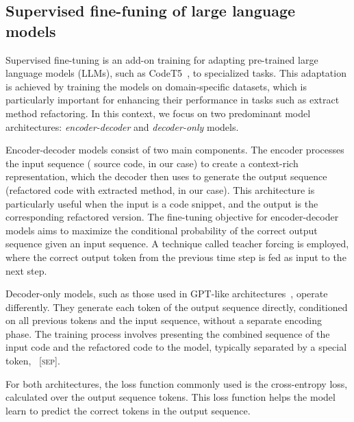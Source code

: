 
\subsection{Supervised fine-funing of large language models}


Supervised fine-tuning is an add-on training for adapting pre-trained large language models (LLMs), such as CodeT5~\cite{wang2021codet5identifierawareunifiedpretrained}, to specialized tasks. 
This adaptation is achieved by training the models on domain-specific datasets, which is particularly important for enhancing their performance in tasks such as extract method refactoring. In this context, we focus on two predominant model architectures: \textit{encoder-decoder} and \textit{decoder-only} models.

Encoder-decoder models consist of two main components. 
The encoder processes the input sequence (\ie{} source code, in our case) to create a context-rich representation, which the decoder then uses to generate the output sequence (refactored code with extracted method, in our case).
This architecture is particularly useful when the input is a code snippet, and the output is the corresponding refactored version. 
The fine-tuning objective for encoder-decoder models aims to maximize the conditional probability of the correct output sequence given an input sequence. 
A technique called teacher forcing is employed, where the correct output token from the previous time step is fed as input to the next step. 

Decoder-only models, such as those used in GPT-like architectures~\cite{radford2019language}, operate differently. They generate each token of the output sequence directly, conditioned on all previous tokens and the input sequence, without a separate encoding phase. The training process involves presenting the combined sequence of the input code and the refactored code to the model, typically separated by a special token, \eg{} ~\textsc{[sep]}.

For both architectures, the loss function commonly used is the cross-entropy loss, calculated over the output sequence tokens. This loss function helps the model learn to predict the correct tokens in the output sequence. 


